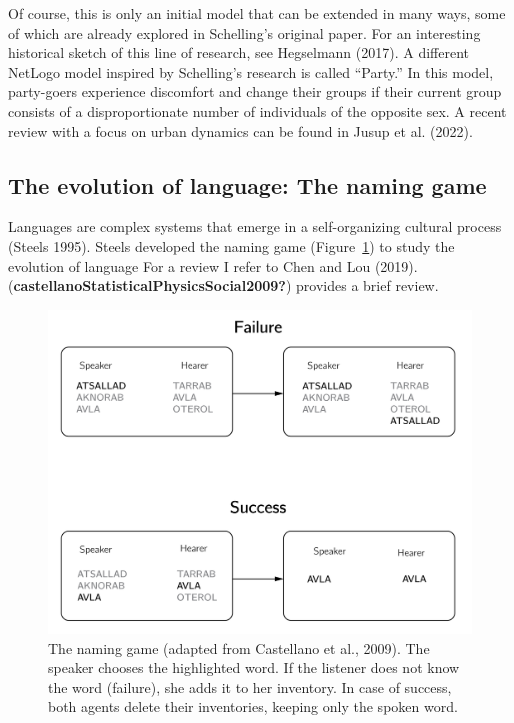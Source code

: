 \documentclass[
  a4paper,
  DIV=11,
  numbers=noendperiod,
  oneside]{scrreprt}
\begin{document}
Of course, this is only an initial model that can be extended in many
ways, some of which are already explored in Schelling's original paper.
For an interesting historical sketch of this line of research, see
Hegselmann (2017). A different NetLogo model inspired by Schelling's
research is called ``Party.'' In this model, party-goers experience
discomfort and change their groups if their current group consists of a
disproportionate number of individuals of the opposite sex. A recent
review with a focus on urban dynamics can be found in Jusup et al.
(2022).

\hypertarget{sec-The-evolution-of-language-The-naming-game}{%
\subsection{The evolution of language: The naming
game}\label{sec-The-evolution-of-language-The-naming-game}}

Languages are complex systems that emerge in a self-organizing cultural
process (Steels 1995). Steels developed the naming game
(Figure~\ref{fig-ch7-img2-old-90}) to study the evolution of language
For a review I refer to Chen and Lou (2019).
(\textbf{castellanoStatisticalPhysicsSocial2009?}) provides a brief
review.

\begin{figure}

{\centering \includegraphics{media/ch7/ch7-2__figure92.png}

}

\caption{\label{fig-ch7-img2-old-90}The naming game (adapted from
Castellano et al., 2009). The speaker chooses the highlighted word. If
the listener does not know the word (failure), she adds it to her
inventory. In case of success, both agents delete their inventories,
keeping only the spoken word.}

\end{figure}
\end{document}
